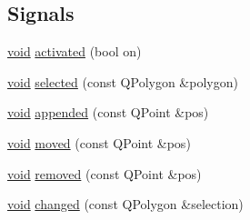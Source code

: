 \subsection*{Signals}
\begin{DoxyCompactItemize}
\item 
\hyperlink{group___u_a_v_objects_plugin_ga444cf2ff3f0ecbe028adce838d373f5c}{void} \hyperlink{class_qwt_picker_a89a2c67a355d6b9bc54348e2f25fe139}{activated} (bool on)
\item 
\hyperlink{group___u_a_v_objects_plugin_ga444cf2ff3f0ecbe028adce838d373f5c}{void} \hyperlink{class_qwt_picker_a283ec139021c9b5e95d1472a9c902c7e}{selected} (const Q\-Polygon \&polygon)
\item 
\hyperlink{group___u_a_v_objects_plugin_ga444cf2ff3f0ecbe028adce838d373f5c}{void} \hyperlink{class_qwt_picker_ad52219271a7c8efab35ded14ac89827a}{appended} (const Q\-Point \&pos)
\item 
\hyperlink{group___u_a_v_objects_plugin_ga444cf2ff3f0ecbe028adce838d373f5c}{void} \hyperlink{class_qwt_picker_adddb4800c1dac0ba807e731f45d40742}{moved} (const Q\-Point \&pos)
\item 
\hyperlink{group___u_a_v_objects_plugin_ga444cf2ff3f0ecbe028adce838d373f5c}{void} \hyperlink{class_qwt_picker_ae43005f819fc423da4bad205d99e4d1e}{removed} (const Q\-Point \&pos)
\item 
\hyperlink{group___u_a_v_objects_plugin_ga444cf2ff3f0ecbe028adce838d373f5c}{void} \hyperlink{class_qwt_picker_ae47a68e89fdd72be75d4d2b92672319e}{changed} (const Q\-Polygon \&selection)
\end{DoxyCompactItemize}
